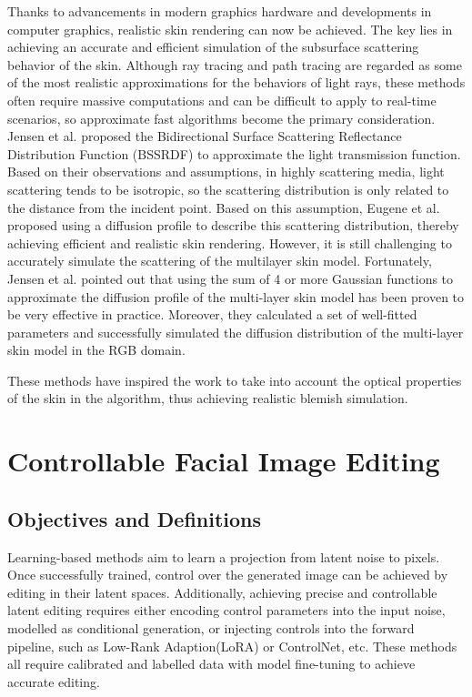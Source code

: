 \begin{spacing}{1.5}
Thanks to advancements in modern graphics hardware and developments in computer graphics, realistic skin rendering can now be achieved\cite{10.1145/1198555.1198593, 2015ExtendingTD, JIMENEZ2015_CGF}. The key lies in achieving an accurate and efficient simulation of the subsurface scattering behavior of the skin. Although ray tracing and path tracing\cite{wrenninge2017path, chiang2016practical} are regarded as some of the most realistic approximations for the behaviors of light rays, these methods often require massive computations and can be difficult to apply to real-time scenarios, so approximate fast algorithms become the primary consideration. Jensen et al.\cite{10.1145/3596711.3596747} proposed the Bidirectional Surface Scattering Reflectance Distribution Function (BSSRDF) to approximate the light transmission function. Based on their observations and assumptions, in highly scattering media, light scattering tends to be isotropic, so the scattering distribution is only related to the distance from the incident point. Based on this assumption, Eugene et al.\cite{d2007efficient} proposed using a diffusion profile to describe this scattering distribution, thereby achieving efficient and realistic skin rendering. However, it is still challenging to accurately simulate the scattering of the multilayer skin model. Fortunately, Jensen et al.\cite{10.1145/1073204.1073308} pointed out that using the sum of 4 or more Gaussian functions to approximate the diffusion profile of the multi-layer skin model has been proven to be very effective in practice. Moreover, they calculated a set of well-fitted parameters and successfully simulated the diffusion distribution of the multi-layer skin model in the RGB domain.

These methods have inspired the work to take into account the optical properties of the skin in the algorithm, thus achieving realistic blemish simulation.

\section{Controllable Facial Image Editing}

\subsection{Objectives and Definitions}

Learning-based methods aim to learn a projection from latent noise to pixels\cite{goodfellowGenerativeAdversarialNetworks2014,DBLP:conf/nips/HoJA20,DBLP:journals/corr/KingmaW13}. Once successfully trained, control over the generated image can be achieved by editing in their latent spaces\cite{DBLP:journals/corr/abs-1812-04948, DBLP:journals/corr/abs-1907-10786}. Additionally, achieving precise and controllable latent editing requires either encoding control parameters into the input noise, modelled as conditional generation\cite{isolaImagetoimageTranslationConditional2017}, or injecting controls into the forward pipeline, such as Low-Rank Adaption(LoRA)\cite{2021arXiv210609685H} or ControlNet\cite{2023arXiv230205543Z}, etc. These methods all require calibrated and labelled data with model fine-tuning to achieve accurate editing.


\end{spacing}
